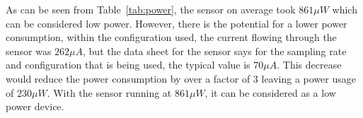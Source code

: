 As can be seen from Table~\ref{tab:power}, the sensor on average took $861\mu W$ which can be considered low power. However, there is the potential for a lower power consumption, within the configuration used, the current flowing through the sensor was $262\mu A$, but the data sheet for the sensor says for the sampling rate and configuration that is being used, the typical value is $70\mu A$. This decrease would reduce the power consumption by over a factor of 3 leaving a power usage of $230\mu W$. With the sensor running at $861\mu W$, it can be considered as a low power device.